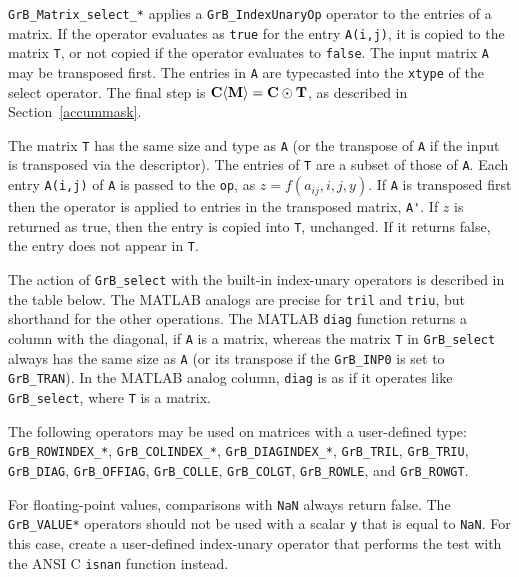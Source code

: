 \documentclass[12pt]{article}
\begin{document}
\verb'GrB_Matrix_select_*' applies a \verb'GrB_IndexUnaryOp' operator to the
entries of a matrix.  If the operator evaluates as \verb'true' for the entry
\verb'A(i,j)', it is copied to the matrix \verb'T', or not copied if the
operator evaluates to \verb'false'.  The input matrix \verb'A' may be
transposed first.  The entries in \verb'A' are typecasted into the \verb'xtype'
of the select operator.  The final step is ${\bf C \langle M \rangle  = C \odot
T}$, as described in Section~\ref{accummask}.

The matrix \verb'T' has the same size and type as \verb'A' (or the transpose of
\verb'A' if the input is transposed via the descriptor).  The entries of
\verb'T' are a subset of those of \verb'A'.  Each entry \verb'A(i,j)' of
\verb'A' is passed to the \verb'op', as $z=f(a_{ij},i,j,y)$.  If
\verb'A' is transposed first then the operator is applied to entries in the
transposed matrix, \verb"A'".  If $z$ is returned as true, then the entry is
copied into \verb'T', unchanged.  If it returns false, the entry does not
appear in \verb'T'.

The action of \verb'GrB_select' with the built-in index-unary operators is
described in the table below.  The MATLAB analogs are precise for \verb'tril'
and \verb'triu', but shorthand for the other operations.  The MATLAB
\verb'diag' function returns a column with the diagonal, if \verb'A' is a
matrix, whereas the matrix \verb'T' in \verb'GrB_select' always has the same
size as \verb'A' (or its transpose if the \verb'GrB_INP0' is set to
\verb'GrB_TRAN').  In the MATLAB analog column, \verb'diag' is as if it
operates like \verb'GrB_select', where \verb'T' is a matrix.

The following operators may be used on matrices with a user-defined type:
\verb'GrB_ROWINDEX_*',
\verb'GrB_COLINDEX_*',
\verb'GrB_DIAGINDEX_*',
\verb'GrB_TRIL', \newline
\verb'GrB_TRIU',
\verb'GrB_DIAG',
\verb'GrB_OFFIAG',
\verb'GrB_COLLE',
\verb'GrB_COLGT',
\verb'GrB_ROWLE',
and
\verb'GrB_ROWGT'.

For floating-point values, comparisons with \verb'NaN' always return false.
The \verb'GrB_VALUE*' operators should not be used with a scalar \verb'y' that is
equal to \verb'NaN'.  For this case, create a user-defined index-unary operator that
performs the test with the ANSI C \verb'isnan' function instead.
\end{document}
